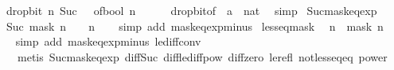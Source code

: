 \begin{isabellebody}
\ \ {\isacartoucheopen}drop{\isacharunderscore}{\kern0pt}bit\ n\ {\isacharparenleft}{\kern0pt}Suc\ {}{\isacharparenright}{\kern0pt}\ {\isacharequal}{\kern0pt}\ of{\isacharunderscore}{\kern0pt}bool\ {\isacharparenleft}{\kern0pt}n\ {\isacharequal}{\kern0pt}\ {}{\isacharparenright}{\kern0pt}{\isacartoucheclose}\isanewline
%
\isadelimproof
\ \ %
\endisadelimproof
%
\isatagproof
{}\isamarkupfalse%
\ drop{\isacharunderscore}{\kern0pt}bit{\isacharunderscore}{\kern0pt}of{\isacharunderscore}{\kern0pt}{}\ {\isacharbrackleft}{\kern0pt}\ {\isacharquery}{\kern0pt}{\isacharprime}{\kern0pt}a\ {\isacharequal}{\kern0pt}\ nat{\isacharbrackright}{\kern0pt}\ \isamarkupfalse%
\ simp%
\endisatagproof
{\isafoldproof}%
%
\isadelimproof
\isanewline
%
\endisadelimproof
\isanewline
{}\isamarkupfalse%
\ Suc{\isacharunderscore}{\kern0pt}mask{\isacharunderscore}{\kern0pt}eq{\isacharunderscore}{\kern0pt}exp{\isacharcolon}{\kern0pt}\isanewline
\ \ {\isacartoucheopen}Suc\ {\isacharparenleft}{\kern0pt}mask\ n{\isacharparenright}{\kern0pt}\ {\isacharequal}{\kern0pt}\ {}\ {\isacharcircum}{\kern0pt}\ n{\isacartoucheclose}\isanewline
%
\isadelimproof
\ \ %
\endisadelimproof
%
\isatagproof
{}\isamarkupfalse%
\ {\isacharparenleft}{\kern0pt}simp\ add{\isacharcolon}{\kern0pt}\ mask{\isacharunderscore}{\kern0pt}eq{\isacharunderscore}{\kern0pt}exp{\isacharunderscore}{\kern0pt}minus{\isacharunderscore}{\kern0pt}{}{\isacharparenright}{\kern0pt}%
\endisatagproof
{\isafoldproof}%
%
\isadelimproof
\isanewline
%
\endisadelimproof
\isanewline
{}\isamarkupfalse%
\ less{\isacharunderscore}{\kern0pt}eq{\isacharunderscore}{\kern0pt}mask{\isacharcolon}{\kern0pt}\isanewline
\ \ {\isacartoucheopen}n\ {\isasymle}\ mask\ n{\isacartoucheclose}\isanewline
%
\isadelimproof
\ \ %
\endisadelimproof
%
\isatagproof
{}\isamarkupfalse%
\ {\isacharparenleft}{\kern0pt}simp\ add{\isacharcolon}{\kern0pt}\ mask{\isacharunderscore}{\kern0pt}eq{\isacharunderscore}{\kern0pt}exp{\isacharunderscore}{\kern0pt}minus{\isacharunderscore}{\kern0pt}{}\ le{\isacharunderscore}{\kern0pt}diff{\isacharunderscore}{\kern0pt}conv{}{\isacharparenright}{\kern0pt}\isanewline
\ \ \ \ {\isacharparenleft}{\kern0pt}metis\ Suc{\isacharunderscore}{\kern0pt}mask{\isacharunderscore}{\kern0pt}eq{\isacharunderscore}{\kern0pt}exp\ diff{\isacharunderscore}{\kern0pt}Suc{\isacharunderscore}{\kern0pt}{}\ diff{\isacharunderscore}{\kern0pt}le{\isacharunderscore}{\kern0pt}diff{\isacharunderscore}{\kern0pt}pow\ diff{\isacharunderscore}{\kern0pt}zero\ le{\isacharunderscore}{\kern0pt}refl\ not{\isacharunderscore}{\kern0pt}less{\isacharunderscore}{\kern0pt}eq{\isacharunderscore}{\kern0pt}eq\ power{\isacharunderscore}{\kern0pt}{}{\isacharparenright}{\kern0pt}%

\end{isabellebody}
